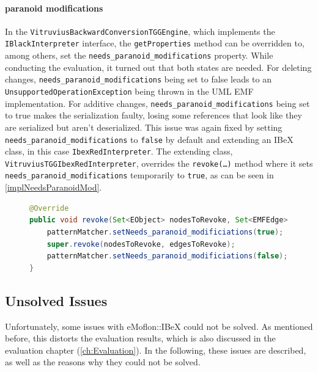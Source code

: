 \paragraph{paranoid modifications} In the \texttt{VitruviusBackwardConversionTGGEngine}, which implements the \texttt{IBlackInterpreter} interface, the 
\texttt{getProperties} method can be overridden to, among others, set the \texttt{needs\_paranoid\_modifications} property.
While conducting the evaluation, it turned out that both states are needed.
For deleting changes, \newline
\texttt{needs\_paranoid\_modifications} being set to false leads to an \newline
\texttt{UnsupportedOperationException} being thrown in the UML EMF implementation. \newline
For additive changes, \texttt{needs\_paranoid\_modifications} being set to true makes the serialization faulty, losing some references that look like they are serialized but aren't deserialized.
This issue was again fixed by setting \texttt{needs\_paranoid\_modifications} to \texttt{false} by default and extending an IBeX class, in this case \texttt{IbexRedInterpreter}. The extending class, \texttt{VitruviusTGGIbexRedInterpreter}, overrides the \texttt{revoke(\dots)} method where it sets \texttt{needs\_paranoid\_modifications} temporarily to \texttt{true}, as can be seen in \autoref{implNeedsParanoidMod}.

\begin{figure}[H]
\centering
\begin{lstlisting}[language=java, caption={Source Model Serialization}, captionpos=b, label=implNeedsParanoidMod]
@Override
public void revoke(Set<EObject> nodesToRevoke, Set<EMFEdge> edgesToRevoke) {
    patternMatcher.setNeeds_paranoid_modificiations(true);
    super.revoke(nodesToRevoke, edgesToRevoke);
    patternMatcher.setNeeds_paranoid_modificiations(false);
}
\end{lstlisting}   
\end{figure}

\subsection{Unsolved Issues}
\label{sec:Implementation:Challenges:unsolved}
Unfortunately, some issues with eMoflon::IBeX could not be solved. As mentioned before, this distorts the evaluation results, which is also discussed in the evaluation chapter (\autoref{ch:Evaluation}).
In the following, these issues are described, as well as the reasons why they could not be solved.

